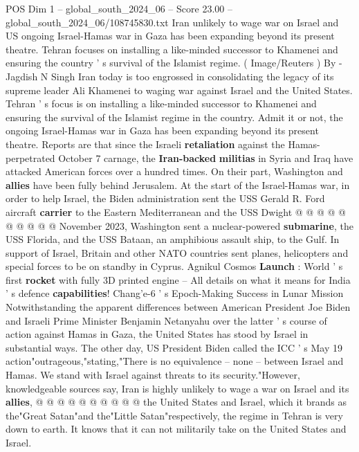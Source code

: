 \begin{textsample}{POS Dim 1 – global\_south\_2024\_06 – Score 23.00 – global\_south\_2024\_06/108745830.txt}  \label{ex:f1_pos_132}
Iran unlikely to wage war on Israel and US ongoing Israel-Hamas war in Gaza has been expanding beyond its present theatre.
Tehran focuses on installing a like-minded successor to Khamenei and ensuring the country ' s survival of the Islamist regime. ( Image/Reuters ) By -Jagdish N Singh Iran today is too engrossed in consolidating the legacy of its supreme leader Ali Khamenei to waging war against Israel and the United States.
Tehran ' s focus is on installing a like-minded successor to Khamenei and ensuring the survival of the Islamist regime in the country.
Admit it or not, the ongoing Israel-Hamas war in Gaza has been expanding beyond its present theatre.
Reports are that since the Israeli \textbf{retaliation} against the Hamas-perpetrated October 7 carnage, the \textbf{Iran-backed} \textbf{militias} in Syria and Iraq have attacked American forces over a hundred times.
On their part, Washington and \textbf{allies} have been fully behind Jerusalem.
At the start of the Israel-Hamas war, in order to help Israel, the Biden administration sent the USS Gerald R.
Ford aircraft \textbf{carrier} to the Eastern Mediterranean and the USS Dwight @ @ @ @ @ @ @ @ @ @ November 2023, Washington sent a nuclear-powered \textbf{submarine}, the USS Florida, and the USS Bataan, an amphibious assault ship, to the Gulf.
In support of Israel, Britain and other NATO countries sent planes, helicopters and special forces to be on standby in Cyprus.
Agnikul Cosmos \textbf{Launch} : World ' s first \textbf{rocket} with fully 3D printed engine -- All details on what it means for India ' s defence \textbf{capabilities}!
Chang'e-6 ' s Epoch-Making Success in Lunar Mission Notwithstanding the apparent differences between American President Joe Biden and Israeli Prime Minister Benjamin Netanyahu over the latter ' s course of action against Hamas in Gaza, the United States has stood by Israel in substantial ways.
The other day, US President Biden called the ICC ' s May 19 action"outrageous,"stating,"There is no equivalence -- none -- between Israel and Hamas.
We stand with Israel against threats to its security."However, knowledgeable sources say, Iran is highly unlikely to wage a war on Israel and its \textbf{allies}, @ @ @ @ @ @ @ @ @ @ the United States and Israel, which it brands as the"Great Satan"and the"Little Satan"respectively, the regime in Tehran is very down to earth.
It knows that it can not militarily take on the United States and Israel.

\end{textsample}
